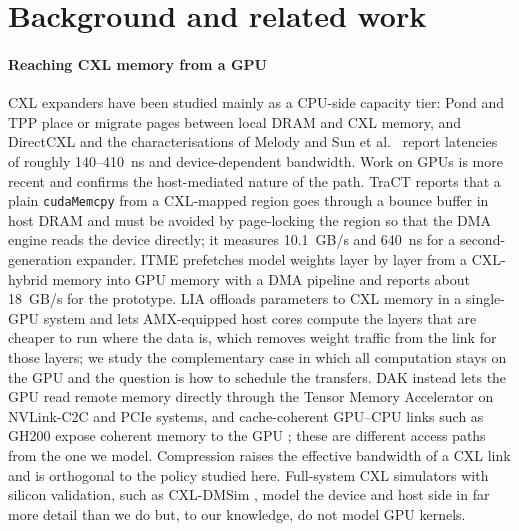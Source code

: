 \documentclass[preprint,12pt]{elsarticle}
\begin{document}
\section{Background and related work}
\label{sec:related}

\paragraph{Reaching CXL memory from a GPU}
CXL expanders have been studied mainly as a CPU-side capacity tier: Pond \cite{pond2023} and TPP \cite{tpp2023} place or migrate pages between local DRAM and CXL memory, and DirectCXL \cite{directcxl2022} and the characterisations of Melody \cite{melody2025} and Sun et al.\ \cite{demystifying2023} report latencies of roughly 140--410~ns and device-dependent bandwidth. Work on GPUs is more recent and confirms the host-mediated nature of the path. TraCT \cite{yoon2025tract} reports that a plain \texttt{cudaMemcpy} from a CXL-mapped region goes through a bounce buffer in host DRAM and must be avoided by page-locking the region so that the DMA engine reads the device directly; it measures 10.1~GB/s and 640~ns for a second-generation expander. ITME \cite{jang2026itme} prefetches model weights layer by layer from a CXL-hybrid memory into GPU memory with a DMA pipeline and reports about 18~GB/s for the prototype. LIA \cite{kim2025lia} offloads parameters to CXL memory in a single-GPU system and lets AMX-equipped host cores compute the layers that are cheaper to run where the data is, which removes weight traffic from the link for those layers; we study the complementary case in which all computation stays on the GPU and the question is how to schedule the transfers. DAK \cite{lin2026dak} instead lets the GPU read remote memory directly through the Tensor Memory Accelerator on NVLink-C2C and PCIe systems, and cache-coherent GPU--CPU links such as GH200 expose coherent memory to the GPU \cite{wang2024hitchhiker}; these are different access paths from the one we model. Compression raises the effective bandwidth of a CXL link \cite{xie2025trace} and is orthogonal to the policy studied here. Full-system CXL simulators with silicon validation, such as CXL-DMSim \cite{wang2025cxldmsim}, model the device and host side in far more detail than we do but, to our knowledge, do not model GPU kernels.
\end{document}
